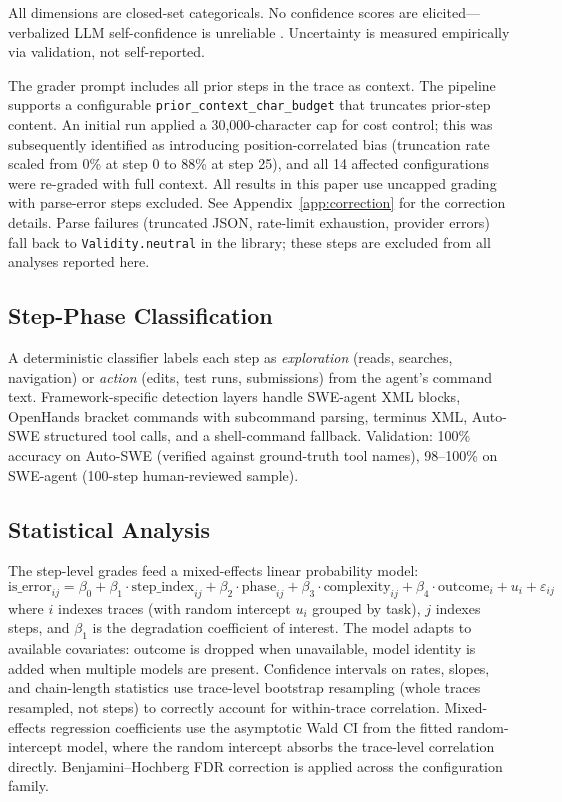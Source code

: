 \documentclass[11pt]{article}
\begin{document}
All dimensions are closed-set categoricals.
No confidence scores are elicited---verbalized LLM self-confidence is unreliable \citep{xiong2023can}.
Uncertainty is measured empirically via validation, not self-reported.

The grader prompt includes all prior steps in the trace as context.
The pipeline supports a configurable \texttt{prior\_context\_char\_budget} that truncates prior-step content.
An initial run applied a 30,000-character cap for cost control; this was subsequently identified as introducing position-correlated bias (truncation rate scaled from 0\% at step 0 to 88\% at step 25), and all 14 affected configurations were re-graded with full context.
All results in this paper use uncapped grading with parse-error steps excluded.
See Appendix~\ref{app:correction} for the correction details.
Parse failures (truncated JSON, rate-limit exhaustion, provider errors) fall back to \texttt{Validity.neutral} in the library; these steps are excluded from all analyses reported here.

\subsection{Step-Phase Classification}

A deterministic classifier labels each step as \emph{exploration} (reads, searches, navigation) or \emph{action} (edits, test runs, submissions) from the agent's command text.
Framework-specific detection layers handle SWE-agent XML blocks, OpenHands bracket commands with subcommand parsing, terminus XML, Auto-SWE structured tool calls, and a shell-command fallback.
Validation: 100\% accuracy on Auto-SWE (verified against ground-truth tool names), 98--100\% on SWE-agent (100-step human-reviewed sample).

\subsection{Statistical Analysis}

The step-level grades feed a mixed-effects linear probability model:
\[
\text{is\_error}_{ij} = \beta_0 + \beta_1 \cdot \text{step\_index}_{ij} + \beta_2 \cdot \text{phase}_{ij} + \beta_3 \cdot \text{complexity}_{ij} + \beta_4 \cdot \text{outcome}_i + u_i + \varepsilon_{ij}
\]
where $i$ indexes traces (with random intercept $u_i$ grouped by task), $j$ indexes steps, and $\beta_1$ is the degradation coefficient of interest.
The model adapts to available covariates: outcome is dropped when unavailable, model identity is added when multiple models are present.
Confidence intervals on rates, slopes, and chain-length statistics use trace-level bootstrap resampling (whole traces resampled, not steps) to correctly account for within-trace correlation. Mixed-effects regression coefficients use the asymptotic Wald CI from the fitted random-intercept model, where the random intercept absorbs the trace-level correlation directly.
Benjamini--Hochberg FDR correction is applied across the configuration family.
\end{document}
